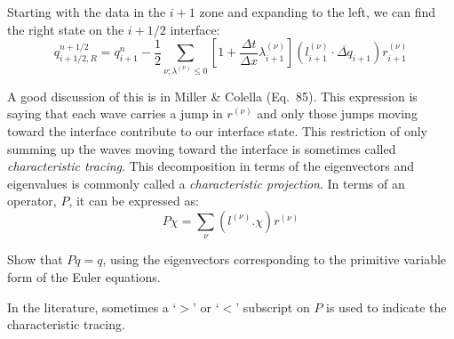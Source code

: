 Starting with the data in the $i+1$ zone and expanding to the left, we can
find the right state on the $i+1/2$ interface:
\begin{equation}
q_{i+1/2,R}^{n+1/2} = q_{i+1}^n - \frac{1}{2} \sum_{\nu; \lambda^{(\nu)} \le 0} 
  \left [ 1 + \frac{\Delta t}{\Delta x} \lambda_{i+1}^{(\nu)} \right ] (l_{i+1}^{(\nu)} \cdot \overline{\Delta q}_{i+1}) r_{i+1}^{(\nu)} 
\end{equation}


A good discussion of this is in Miller \& Colella
\cite{millercolella:2002} (Eq.\ 85).  This expression is saying that
each wave carries a jump in $r^{(\nu)}$ and only those jumps moving
toward the interface contribute to our interface state.  This
restriction of only summing up the waves moving toward the interface
is sometimes called {\em characteristic tracing}.  This decomposition
in terms of the eigenvectors and eigenvalues is commonly called a {\em
  characteristic projection}.  In terms of an operator, $P$, it can be
expressed as:
\begin{equation}
P \chi = \sum_\nu (l^{(\nu)} . \chi) r^{(\nu)}
\end{equation}
\begin{exercise}
{
Show that $P q = q$, using the eigenvectors corresponding to the primitive
 variable form of the Euler equations.}
\end{exercise}
In the literature, sometimes a `$>$' or `$<$' subscript on $P$ is used
to indicate the characteristic tracing.

